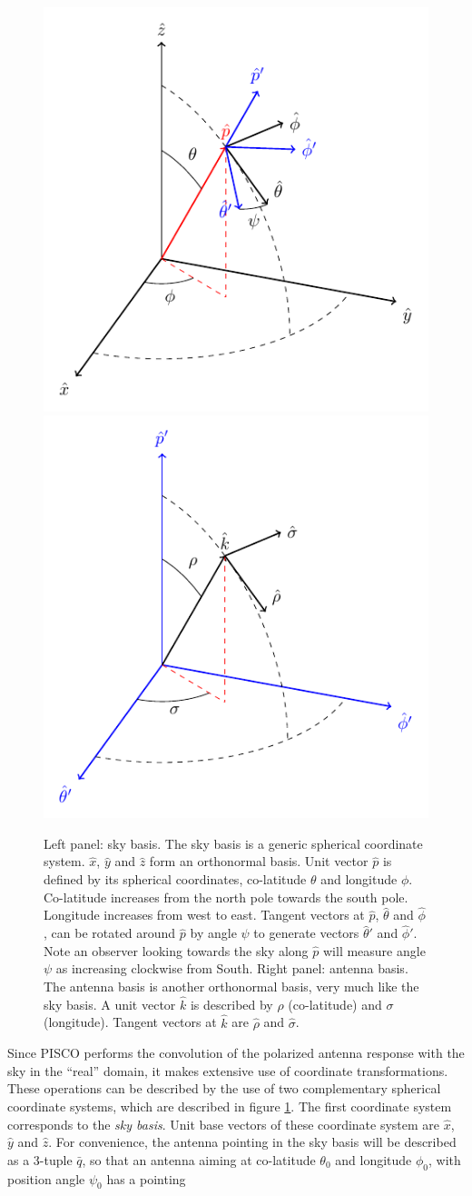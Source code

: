 \documentclass[a4paper,11pt]{article}
\begin{document}
\begin{figure}
	\centering
	\includegraphics[width=0.47\linewidth]{tikz/sky_basis}	
	\includegraphics[width=0.47\linewidth]{tikz/beam_basis}
	\caption{Left panel: sky basis. The sky basis is a generic spherical coordinate system. $\hat{x}$, $\hat{y}$ and $\hat{z}$ form an orthonormal basis. Unit vector $\hat{p}$ is defined by its spherical coordinates, co-latitude $\theta$ and longitude $\phi$. Co-latitude increases from the north pole towards the south pole. Longitude increases from west to east. Tangent vectors at $\hat{p}$, $\hat{\theta}$ and $\hat{\phi}$, can be rotated around $\hat{p}$ by angle $\psi$ to generate vectors $\hat{\theta}'$ and $\hat{\phi}'$. Note an observer looking towards the sky along $\hat{p}$ will measure angle $\psi$ as increasing clockwise from South. Right panel: antenna basis. The antenna basis is another orthonormal basis, very much like the sky basis. A unit vector $\hat{k}$ is described by $\rho$ (co-latitude) and $\sigma$ (longitude). Tangent vectors at $\hat{k}$ are $\hat{\rho}$ and $\hat{\sigma}$. }
	\label{fig::sky_basis} 
\end{figure}

Since PISCO performs the convolution of the polarized antenna response with the sky in the ``real'' domain, it makes extensive use of coordinate transformations. These operations can be described by the use of two complementary spherical coordinate systems, which are described in figure \ref{fig::sky_basis}. The first coordinate system corresponds to the \textsl{sky basis}. Unit base vectors of these coordinate system are $\hat{x}$, $\hat{y}$ and $\hat{z}$. For convenience, the antenna pointing in the sky basis will be described as a 3-tuple $\bar{q}$, so that an antenna aiming at co-latitude $\theta_0$ and longitude $\phi_0$, with position angle $\psi_0$ has a pointing 
\end{document}
